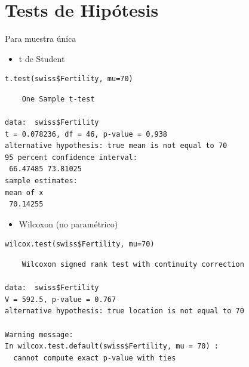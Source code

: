\documentclass[xcolor={usenames,svgnames,dvipsnames}]{beamer}
\begin{document}
\section{Tests de Hipótesis}
\label{sec-4}
\begin{frame}[fragile,label=sec-4-1]{Para muestra única}
 \begin{itemize}
\item t de Student
\end{itemize}
\lstset{language=R,label= ,caption= ,numbers=none}
\begin{lstlisting}
t.test(swiss$Fertility, mu=70)
\end{lstlisting}

\begin{verbatim}
	One Sample t-test

data:  swiss$Fertility
t = 0.078236, df = 46, p-value = 0.938
alternative hypothesis: true mean is not equal to 70
95 percent confidence interval:
 66.47485 73.81025
sample estimates:
mean of x 
 70.14255
\end{verbatim}

\begin{itemize}
\item Wilcoxon (no paramétrico)
\end{itemize}
\lstset{language=R,label= ,caption= ,numbers=none}
\begin{lstlisting}
wilcox.test(swiss$Fertility, mu=70)
\end{lstlisting}

\begin{verbatim}
	Wilcoxon signed rank test with continuity correction

data:  swiss$Fertility
V = 592.5, p-value = 0.767
alternative hypothesis: true location is not equal to 70

Warning message:
In wilcox.test.default(swiss$Fertility, mu = 70) :
  cannot compute exact p-value with ties
\end{verbatim}
\end{frame}
\end{document}

